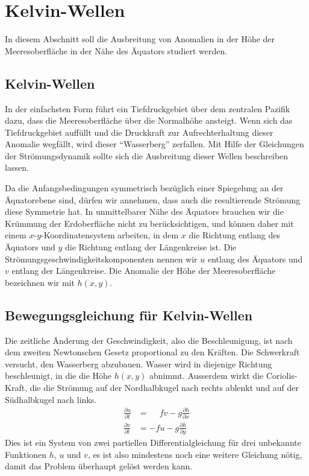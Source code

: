 %
%
%
\section{Kelvin-Wellen\label{section:elnino:kelvin}}
In diesem Abschnitt soll die Ausbreitung von Anomalien in der Höhe
der Meeresoberfläche in der Nähe des Äquators studiert werden.

\subsection{Kelvin-Wellen\label{subsection:kelvin}}
In der einfachsten Form führt ein Tiefdruckgebiet über dem zentralen
Pazifik dazu, dass die Meeresoberfläche über die Normalhöhe ansteigt.
Wenn sich das Tiefdruckgebiet auffüllt und die Druckkraft zur Aufrechterhaltung
dieser Anomalie wegfällt, wird dieser ``Wasserberg'' zerfallen.
Mit Hilfe der Gleichungen der Strömungsdynamik sollte sich die Ausbreitung
dieser Wellen beschreiben lassen.

Da die Anfangsbedingungen symmetrisch bezüglich einer Spiegelung an
der Äquatorebene sind, dürfen wir annehmen, dass auch die resultierende
Strömung diese Symmetrie hat.
In unmittelbarer Nähe des Äquators brauchen wir die Krümmung der
Erdoberfläche nicht zu berücksichtigen, und können daher mit einem
$x$-$y$-Koordinatensystem arbeiten, in dem $x$ die Richtung entlang des
Äquators und $y$ die Richtung entlang der Längenkreise ist.
Die Strömungsgeschwindigkeitskomponenten nennen wir $u$ entlang des
Äquators und $v$ entlang der Längenkreise.
Die Anomalie der Höhe der Meeresoberfläche bezeichnen wir mit $h(x,y)$.

\subsection{Bewegungsgleichung für Kelvin-Wellen}
Die zeitliche Änderung der Geschwindigkeit, also die Beschleunigung,
ist nach dem zweiten Newtonschen Gesetz proportional zu den Kräften.
Die Schwerkraft versucht, den Wasserberg abzubauen.
Wasser wird in diejenige Richtung beschleunigt, in die die Höhe $h(x,y)$
abnimmt.
Ausserdem wirkt die Coriolis-Kraft, die die Strömung auf der Nordhalbkugel
nach rechts ablenkt und auf der Südhalbkugel nach links.
\begin{equation}
\begin{aligned}
\frac{\partial u}{\partial t}
&=
\phantom{-}
fv - g\frac{\partial h}{\partial x}
\\
\frac{\partial v}{\partial t}
&=
-fu - g\frac{\partial h}{\partial y}
\end{aligned}
\label{elnino:kelvin:newton}
\end{equation}
Dies ist ein System von zwei partiellen Differentialgleichung für 
drei unbekannte Funktionen $h$, $u$ und $v$, es ist also mindestens
noch eine weitere Gleichung nötig, damit das Problem überhaupt gelöst
werden kann.

